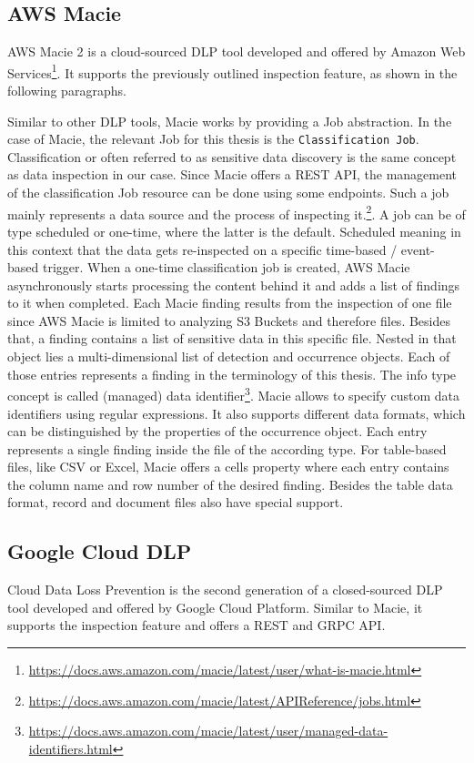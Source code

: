 \subsection{AWS Macie}

AWS Macie 2 is a cloud-sourced DLP tool developed and offered by Amazon Web Services\footnote{\url{https://docs.aws.amazon.com/macie/latest/user/what-is-macie.html}}. It supports the previously outlined inspection feature, as shown in the following paragraphs.


Similar to other DLP tools, Macie works by providing a Job abstraction. In the case of Macie, the relevant Job for this thesis is the \texttt{Classification Job}. Classification or often referred to as sensitive data discovery is the same concept as data inspection in our case. Since Macie offers a REST API, the management of the classification Job resource can be done using some endpoints. Such a job mainly represents a data source and the process of inspecting it.\footnote{\url{https://docs.aws.amazon.com/macie/latest/APIReference/jobs.html}}. A job can be of type scheduled or one-time, where the latter is the default. Scheduled meaning in this context that the data gets re-inspected on a specific time-based / event-based trigger. When a one-time classification job is created, AWS Macie asynchronously starts processing the content behind it and adds a list of findings to it when completed. Each Macie finding results from the inspection of one file since AWS Macie is limited to analyzing S3 Buckets and therefore files. Besides that, a finding contains a list of sensitive data in this specific file. Nested in that object lies a multi-dimensional list of detection and occurrence objects. Each of those entries represents a finding in the terminology of this thesis. The info type concept is called (managed) data identifier\footnote{\url{https://docs.aws.amazon.com/macie/latest/user/managed-data-identifiers.html}}.
Macie allows to specify custom data identifiers using regular expressions. It also supports different data formats, which can be distinguished by the properties of the occurrence object. Each entry represents a single finding inside the file of the according type. For table-based files, like CSV or Excel, Macie offers a cells property where each entry contains the column name and row number of the desired finding. Besides the table data format, record and document files also have special support.

\subsection{Google Cloud DLP}
Cloud Data Loss Prevention is the second generation of a closed-sourced DLP tool developed and offered by Google Cloud Platform. Similar to Macie, it supports the inspection feature and offers a REST and GRPC API.


